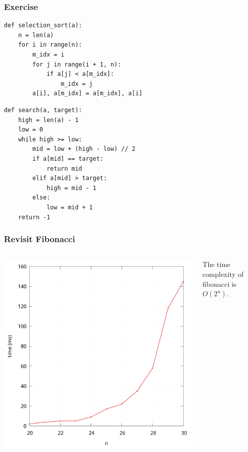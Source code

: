 \documentclass[aspectratio=169, 14pt]{beamer}
\begin{document}
\begin{frame}[fragile]
    \frametitle{Exercise}
\begin{verbatim}
def selection_sort(a):
    n = len(a)
    for i in range(n):
        m_idx = i
        for j in range(i + 1, n):
            if a[j] < a[m_idx]:
                m_idx = j
        a[i], a[m_idx] = a[m_idx], a[i]    
\end{verbatim}
\end{frame}

\begin{frame}[fragile]
\begin{verbatim}
def search(a, target):
    high = len(a) - 1
    low = 0
    while high >= low:
        mid = low + (high - low) // 2
        if a[mid] == target:
            return mid
        elif a[mid] > target:
            high = mid - 1
        else:
            low = mid + 1
    return -1  
\end{verbatim}    

\end{frame}

\begin{frame}
    \frametitle{Revisit Fibonacci}
\begin{columns}
    \begin{center}
        \includegraphics[height=.8\paperheight]{week2/fib_python}    
    \end{center}
The time complexity of fibonacci is $O(2^n)$.

\end{columns}

\end{frame}
\end{document}
